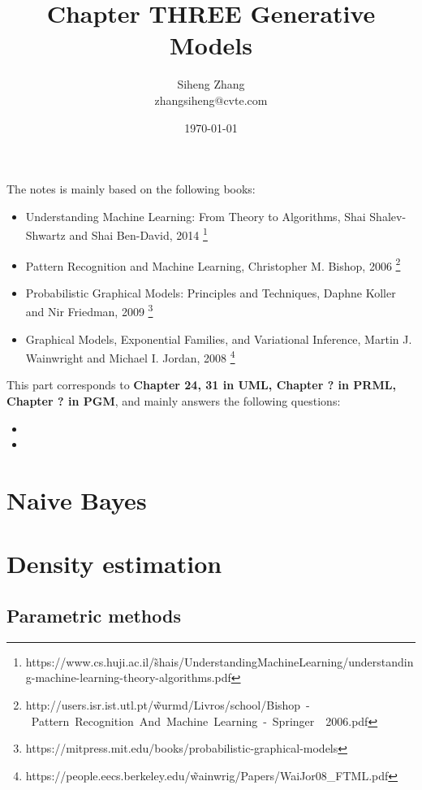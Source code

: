 \documentclass{article}
\author{Siheng Zhang\\zhangsiheng@cvte.com}
\title{Chapter THREE Generative Models}
\date{\today}
\begin{document}
\maketitle  

The notes is mainly based on the following books:

\begin{itemize}
\item Understanding Machine Learning: From Theory to Algorithms, Shai Shalev-Shwartz and Shai Ben-David, 2014 \footnote{https://www.cs.huji.ac.il/\~shais/UnderstandingMachineLearning/understanding-machine-learning-theory-algorithms.pdf}

\item Pattern Recognition and Machine Learning, Christopher M. Bishop, 2006 \footnote{http://users.isr.ist.utl.pt/\~wurmd/Livros/school/Bishop\ -\ Pattern\ Recognition\ And\ Machine\ Learning\ -\ Springer\ \ 2006.pdf}

\item Probabilistic Graphical Models: Principles and Techniques, Daphne Koller and Nir Friedman, 2009 \footnote{https://mitpress.mit.edu/books/probabilistic-graphical-models}

\item Graphical Models, Exponential Families, and Variational Inference, Martin J. Wainwright and Michael I. Jordan, 2008 \footnote{https://people.eecs.berkeley.edu/\~wainwrig/Papers/WaiJor08\_FTML.pdf}
\end{itemize}

This part corresponds to \textbf{Chapter 24, 31 in UML, Chapter ? in PRML, Chapter ? in PGM}, and mainly answers the following questions:

\begin{itemize}
\item 
\item 
\end{itemize}

\newpage

\tableofcontents
\newpage

\section{Naive Bayes}

\section{Density estimation}
	\subsection{Parametric methods}
\end{document}
